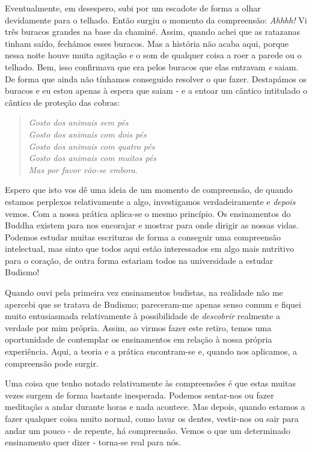 Eventualmente, em desespero, subi por um escadote de forma a olhar
devidamente para o telhado. Então surgiu o momento da compreensão:
\emph{Ahhhh!} Vi três buracos grandes na base da chaminé. Assim, quando
achei que as ratazanas tinham saído, fechámos esses buracos. Mas a
história não acaba aqui, porque nessa noite houve muita agitação e o som
de qualquer coisa a roer a parede ou o telhado. Bem, isso confirmava que
era pelos buracos que elas entravam \emph{e} saiam. De forma que ainda
não tínhamos conseguido resolver o que fazer. Destapámos os buracos e eu
estou apenas à espera que saiam - e a entoar um cântico intitulado o
cântico de proteção das cobras:

\begin{quote}
  \itshape
  Gosto dos animais sem pés\\
  Gosto dos animais com dois pés\\
  Gosto dos animais com quatro pés\\
  Gosto dos animais com muitos pés\\
  Mas por favor vão-se embora.
\end{quote}

Espero que isto vos dê uma ideia de um momento de compreensão, de quando
estamos perplexos relativamente a algo, investigamos verdadeiramente e
\emph{depois} vemos. Com a nossa prática \mbox{aplica-se} o mesmo princípio. Os
ensinamentos do Buddha existem para nos encorajar e mostrar para onde
dirigir as nossas vidas. Podemos estudar muitas escrituras de forma a
conseguir uma compreensão intelectual, mas sinto que todos aqui estão
interessados em algo mais nutritivo para o coração, de outra forma
estariam todos na universidade a estudar Budismo!

Quando ouvi pela primeira vez ensinamentos budistas, na realidade não me
apercebi que se tratava de Budismo; pareceram-me apenas senso comum e
fiquei muito entusiasmada relativamente à possibilidade de
\emph{descobrir} realmente a verdade por mim própria. Assim, ao virmos
fazer este retiro, temos uma oportunidade de contemplar os ensinamentos
em relação à nossa própria experiência. Aqui, a teoria e a prática
encontram-se e, quando nos aplicamos, a compreensão pode surgir.

Uma coisa que tenho notado relativamente às compreensões é que estas
muitas vezes surgem de forma bastante inesperada. Podemos sentar-nos ou
fazer meditação a andar durante horas e nada acontece. Mas depois,
quando estamos a fazer qualquer coisa muito normal, como lavar os
dentes, vestir-nos ou sair para andar um pouco - de repente, há
compreensão. Vemos o que um determinado ensinamento quer dizer -
torna-se real para nós.

